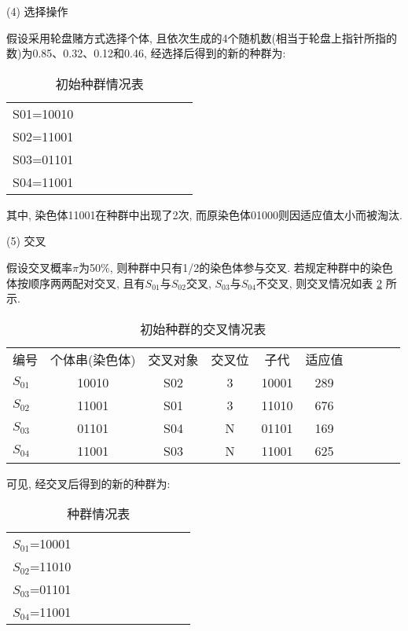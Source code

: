 (4) 选择操作

假设采用轮盘赌方式选择个体, 且依次生成的4个随机数(相当于轮盘上指针所指的数)为0.85、0.32、0.12和0.46, 经选择后得到的新的种群为:
\begin{table} [H]
\caption{初始种群情况表}
\vspace{-0.6cm}
\begin{center}
\begin{tabular} {lccccccccc}
\hline
    S01=10010\\
    S02=11001\\
    S03=01101\\
    S04=11001\\
\hline
\end{tabular}
\end{center}
\label{AI_table2019112803}\vspace{-0.4cm}
\end{table}
其中, 染色体11001在种群中出现了2次, 而原染色体01000则因适应值太小而被淘汰.

(5) 交叉

假设交叉概率$\pi$为50\%, 则种群中只有1/2的染色体参与交叉.
若规定种群中的染色体按顺序两两配对交叉, 且有$S_{01}$与$S_{02}$交叉, $S_{03}$与$S_{04}$不交叉, 则交叉情况如表 \ref{AI_table2019112804} 所示.

\begin{table} [H]
\caption{初始种群的交叉情况表}
\vspace{-0.6cm}
\begin{center}
\begin{tabular} {lccccccccc}
  \hline
编号&	个体串(染色体)&	交叉对象	&交叉位&	  子代	& 适应值\\
$S_{01}$	&10010&	S02&	3	&10001	&289\\
$S_{02}$	&11001&	S01&	3	&11010	&676\\
$S_{03}$	&01101&	S04&	N	&01101	&169\\
$S_{04}$	&11001&	S03&	N	&11001	&625\\
\hline
\end{tabular}
\end{center}
\label{AI_table2019112804}\vspace{-0.4cm}
\end{table}

可见, 经交叉后得到的新的种群为:
\begin{table} [H]
\caption{种群情况表}
\vspace{-0.6cm}
\begin{center}
\begin{tabular} {lccccccccc}
\hline
    $S_{01}$=10001\\
    $S_{02}$=11010\\
    $S_{03}$=01101\\
    $S_{04}$=11001\\
\hline
\end{tabular}
\end{center}\vspace{-0.4cm}
\end{table}


